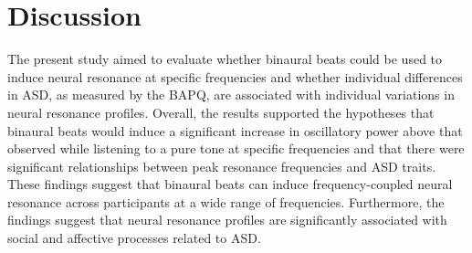 \section{Discussion}
The present study aimed to evaluate whether binaural beats could be used to induce neural resonance at specific frequencies and whether individual differences in ASD, as measured by the BAPQ, are associated with individual variations in neural resonance profiles. Overall, the results supported the hypotheses that binaural beats would induce a significant increase in oscillatory power above that observed while listening to a pure tone at specific frequencies and that there were significant relationships between peak resonance frequencies and ASD traits. These findings suggest that binaural beats can induce frequency-coupled neural resonance across participants at a wide range of frequencies. Furthermore, the findings suggest that neural resonance profiles are significantly associated with social and affective processes related to ASD.

